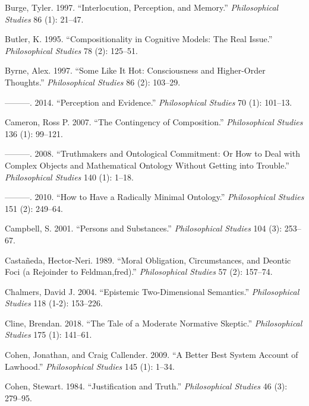 \documentclass[
  10pt,
  letterpaper,
  DIV=11,
  numbers=noendperiod,
  twoside]{scrartcl}
\newlength{\cslhangindent}
\newenvironment{CSLReferences}[2] %
 {\begin{list}{}{%
  \setlength{\itemindent}{0pt}
  \setlength{\leftmargin}{0pt}
  \setlength{\parsep}{0pt}
  \ifodd #1
   \setlength{\leftmargin}{\cslhangindent}
   \setlength{\itemindent}{-1\cslhangindent}
  \fi
  \setlength{\itemsep}{#2\baselineskip}}}
 {\end{list}}
\begin{document}
\begin{CSLReferences}{1}{0}
Burge, Tyler. 1997. {``Interlocution, Perception, and Memory.''}
\emph{Philosophical Studies} 86 (1): 21--47.

Butler, K. 1995. {``Compositionality in Cognitive Models: The Real
Issue.''} \emph{Philosophical Studies} 78 (2): 125--51.

Byrne, Alex. 1997. {``Some Like It Hot: Consciousness and Higher-Order
Thoughts.''} \emph{Philosophical Studies} 86 (2): 103--29.

---------. 2014. {``Perception and Evidence.''} \emph{Philosophical
Studies} 70 (1): 101--13.

Cameron, Ross P. 2007. {``The Contingency of Composition.''}
\emph{Philosophical Studies} 136 (1): 99--121.

---------. 2008. {``Truthmakers and Ontological Commitment: Or How to
Deal with Complex Objects and Mathematical Ontology Without Getting into
Trouble.''} \emph{Philosophical Studies} 140 (1): 1--18.

---------. 2010. {``How to Have a Radically Minimal Ontology.''}
\emph{Philosophical Studies} 151 (2): 249--64.

Campbell, S. 2001. {``Persons and Substances.''} \emph{Philosophical
Studies} 104 (3): 253--67.

Castañeda, Hector-Neri. 1989. {``Moral Obligation, Circumstances, and
Deontic Foci (a Rejoinder to Feldman,fred).''} \emph{Philosophical
Studies} 57 (2): 157--74.

Chalmers, David J. 2004. {``Epistemic Two-Dimensional Semantics.''}
\emph{Philosophical Studies} 118 (1-2): 153--226.

Cline, Brendan. 2018. {``The Tale of a Moderate Normative Skeptic.''}
\emph{Philosophical Studies} 175 (1): 141--61.

Cohen, Jonathan, and Craig Callender. 2009. {``A Better Best System
Account of Lawhood.''} \emph{Philosophical Studies} 145 (1): 1--34.

Cohen, Stewart. 1984. {``Justification and Truth.''} \emph{Philosophical
Studies} 46 (3): 279--95.


\end{CSLReferences}
\end{document}

